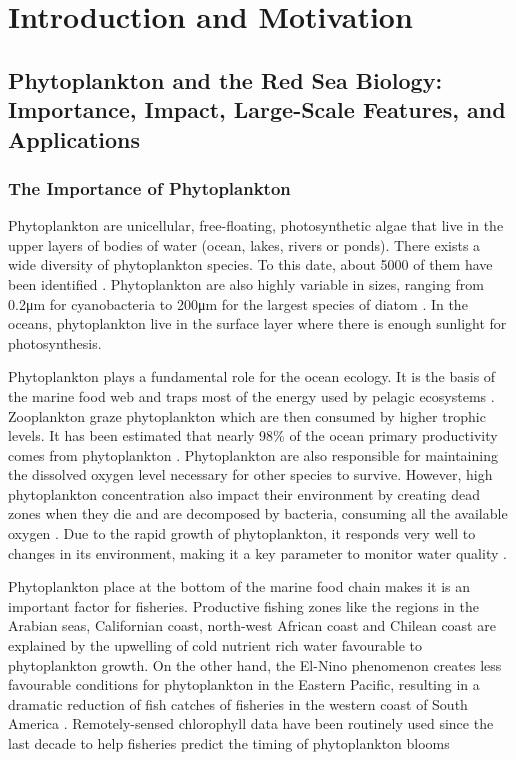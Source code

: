 \chapter{Introduction and Motivation}

\section{Phytoplankton and the Red Sea Biology: Importance, Impact, Large-Scale
Features, and Applications}

\subsection{The Importance of Phytoplankton}

Phytoplankton are unicellular, free-floating, photosynthetic algae that live in the upper layers of bodies of water (ocean, lakes, rivers or ponds). There exists a wide diversity of phytoplankton species. To this date, about 5000 of them have been identified \cite{Tett1995}. Phytoplankton are also highly variable in sizes, ranging from 0.2μm for cyanobacteria to 200μm for the largest species of diatom \cite{Pal2014}. In the oceans, phytoplankton live in the surface layer where there is enough sunlight for photosynthesis. 

Phytoplankton plays a fundamental role for the ocean ecology. It is the basis of the marine food web and traps most of the energy used by pelagic ecosystems \cite{Pal2014}. Zooplankton graze phytoplankton which are then consumed by higher trophic levels. It has been estimated that nearly 98\% of the ocean primary productivity comes from phytoplankton \cite{Pal2014}. Phytoplankton are also responsible for maintaining the dissolved oxygen level necessary for other species to survive. However, high phytoplankton concentration also impact their environment by creating dead zones when they die and are decomposed by bacteria, consuming all the available oxygen \cite{Pal2014}. Due to the rapid growth of phytoplankton, it responds very well to changes in its environment, making it a key parameter to monitor water quality \cite{Wu2014}.

Phytoplankton place at the bottom of the marine food chain makes it is an important factor for fisheries. Productive fishing zones like the regions in the Arabian seas, Californian coast, north-west African coast and Chilean coast are explained by the upwelling of cold nutrient rich water favourable to phytoplankton growth. On the other hand, the El-Nino phenomenon creates less favourable conditions for phytoplankton in the Eastern Pacific, resulting in a dramatic reduction of fish catches of fisheries in the western coast of South America \cite{Robinson2010}. Remotely-sensed chlorophyll data have been routinely used since the last decade to help fisheries predict the timing of phytoplankton blooms \cite{Robinson2010}

